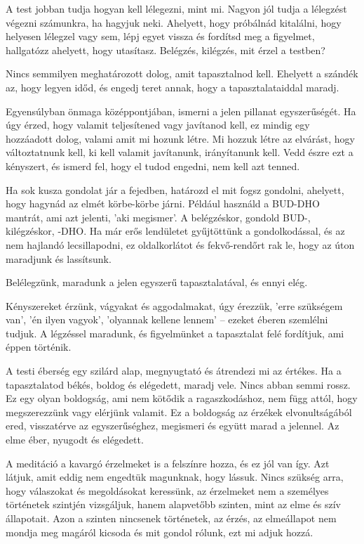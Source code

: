 A test jobban tudja hogyan kell lélegezni, mint mi. Nagyon jól tudja a
lélegzést végezni számunkra, ha hagyjuk neki. Ahelyett, hogy próbálnád
kitalálni, hogy helyesen lélegzel vagy sem, lépj egyet vissza és
fordítsd meg a figyelmet, hallgatózz ahelyett, hogy utasítasz. Belégzés,
kilégzés, mit érzel a testben?

Nincs semmilyen meghatározott dolog, amit tapasztalnod kell. Ehelyett a
szándék az, hogy legyen időd, és engedj teret annak, hogy a
tapasztalataiddal maradj.

Egyensúlyban önmaga középpontjában, ismerni a jelen pillanat
egyszerűségét. Ha úgy érzed, hogy valamit teljesítened vagy javítanod
kell, ez mindig egy hozzáadott dolog, valami amit mi hozunk létre. Mi
hozzuk létre az elvárást, hogy változtatnunk kell, ki kell valamit
javítanunk, irányítanunk kell. Vedd észre ezt a kényszert, és ismerd
fel, hogy el tudod engedni, nem kell azt tenned.

Ha sok kusza gondolat jár a fejedben, határozd el mit fogsz gondolni,
ahelyett, hogy hagynád az elmét körbe-körbe járni. Például használd a
BUD-DHO mantrát, ami azt jelenti, 'aki megismer'. A belégzéskor, gondold
BUD-, kilégzéskor, -DHO. Ha már erős lendületet gyűjtöttünk a
gondolkodással, és az nem hajlandó lecsillapodni, ez oldalkorlátot és
fekvő-rendőrt rak le, hogy az úton maradjunk és lassítsunk.

Belélegzünk, maradunk a jelen egyszerű tapasztalatával, és ennyi elég.

Kényszereket érzünk, vágyakat és aggodalmakat, úgy érezzük, 'erre
szükségem van', 'én ilyen vagyok', 'olyannak kellene lennem' -- ezeket
éberen szemlélni tudjuk. A légzéssel maradunk, és figyelmünket a
tapasztalat felé fordítjuk, ami éppen történik.

A testi éberség egy szilárd alap, megnyugtató és átrendezi mi az
értékes. Ha a tapasztalatod békés, boldog és elégedett, maradj vele.
Nincs abban semmi rossz. Ez egy olyan boldogság, ami nem kötődik a
ragaszkodáshoz, nem függ attól, hogy megszerezzünk vagy elérjünk
valamit. Ez a boldogság az érzékek elvonultságából ered, visszatérve az
egyszerűséghez, megismeri és együtt marad a jelennel. Az elme éber,
nyugodt és elégedett.

A meditáció a kavargó érzelmeket is a felszínre hozza, és ez jól van
így. Azt látjuk, amit eddig nem engedtük magunknak, hogy lássuk. Nincs
szükség arra, hogy válaszokat és megoldásokat keressünk, az érzelmeket
nem a személyes történetek szintjén vizsgáljuk, hanem alapvetőbb
szinten, mint az elme és szív állapotait. Azon a szinten nincsenek
történetek, az érzés, az elmeállapot nem mondja meg magáról kicsoda és
mit gondol rólunk, ezt mi adjuk hozzá.

